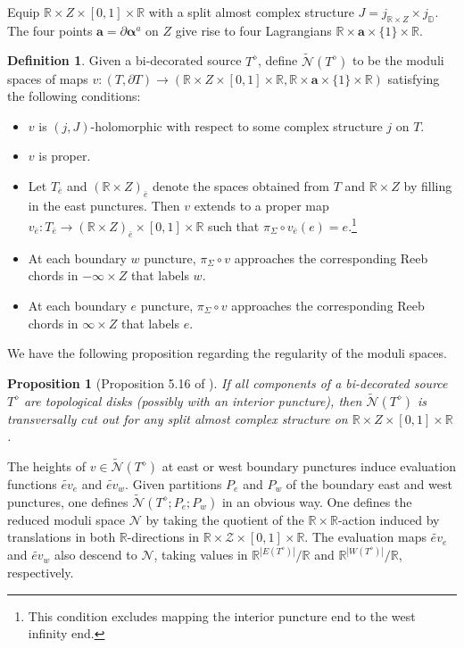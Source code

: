\documentclass{amsart}
\newtheorem{prop}[thm]{Proposition}
\theoremstyle{definition}
\newtheorem{defn}[thm]{Definition}
\theoremstyle{remark}
\numberwithin{equation}{section}
\numberwithin{equation}{section} \makeatletter
\begin{document}
Equip $\mathbb{R}\times Z\times[0,1]\times \mathbb{R}$ with a split almost complex structure $J=j_{\mathbb{R}\times Z}\times j_\mathbb{D}$. The four points $\textbf{a}=\partial{\bm{\alpha}^a}$ on $Z$ give rise to four Lagrangians $\mathbb{R}\times \textbf{a}\times\{1\}\times\mathbb{R}$.
\begin{defn}
Given a bi-decorated source $T^\diamond$, define $\widetilde{\mathcal{N}}(T^\diamond)$ to be the moduli spaces of maps $v:(T,\partial T)\rightarrow (\mathbb{R}\times Z\times[0,1]\times \mathbb{R},\mathbb{R}\times \textbf{a}\times\{1\}\times\mathbb{R})$ satisfying the following conditions:
\begin{itemize}
\item[(N-1)] $v$ is $(j,J)$-holomorphic with respect to some complex structure $j$ on $T$.
\item[(N-2)] $v$ is proper.
\item[(N-3)] Let $T_{\bar{e}}$ and $(\mathbb{R}\times Z)_{\bar{e}}$ denote the spaces obtained from $T$ and $\mathbb{R}\times Z$ by filling in the east punctures. Then $v$ extends to a proper map $v_{\bar{e}}:T_{\bar{e}}\rightarrow (\mathbb{R}\times Z)_{\bar{e}}\times [0,1]\times \mathbb{R}$ such that $\pi_\Sigma\circ v_{\bar{e}}(e)=e$.\footnote{This condition excludes mapping the interior puncture end to the west infinity end.}  
\item[(N-4)]At each boundary $w$ puncture, $\pi_{\Sigma}\circ v$ approaches the  corresponding Reeb chords in $-\infty\times Z$ that labels $w$.
\item[(N-5)]At each boundary $e$ puncture, $\pi_{\Sigma}\circ v$ approaches the corresponding Reeb chords in $\infty\times Z$ that labels $e$.
\end{itemize}
\end{defn}

We have the following proposition regarding the regularity of the moduli spaces.

\begin{prop}[Proposition 5.16 of \cite{LOT18}]\label{Proposition, regularity for holomorphic curves in R times Z times [0,1] times R}
If all components of a bi-decorated source $T^\diamond$ are topological disks (possibly with an interior puncture), then $\widetilde{\mathcal{N}}(T^\diamond)$ is transversally cut out for any split almost complex structure on $\mathbb{R}\times Z\times[0,1]\times \mathbb{R}$. 
\end{prop}

The heights of $v\in \widetilde{\mathcal{N}}(T^\diamond)$ at east or west boundary punctures induce evaluation functions $\widetilde{ev}_e$ and $\widetilde{ev}_w$. Given partitions $P_e$ and $P_w$ of the boundary east and west punctures, one defines $\widetilde{\mathcal{N}}(T^\diamond; P_e;P_w)$ in an obvious way. One defines the reduced moduli space $\mathcal{N}$ by taking the quotient of the $\mathbb{R}\times \mathbb{R}$-action induced by translations in both $\mathbb{R}$-directions in $\mathbb{R}\times \mathcal{Z}\times [0,1] \times \mathbb{R}$. The evaluation maps $\widetilde{ev}_e$ and $\widetilde{ev}_w$ also descend to $\mathcal{N}$, taking values in $\mathbb{R}^{|E(T^\diamond)|}/\mathbb{R}$ and $\mathbb{R}^{|W(T^\diamond)|}/\mathbb{R}$, respectively.
\end{document}
